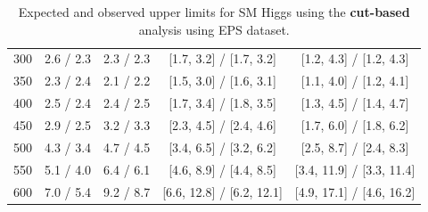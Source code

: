 \begin{table}[hbp!]
\begin{center}
\begin{tabular}{c c c c c}
300 & 2.6 / 2.3 & 2.3 / 2.3 & [1.7, 3.2] / [1.7, 3.2] & [1.2, 4.3] / [1.2, 4.3] \\
350 & 2.3 / 2.4 & 2.1 / 2.2 & [1.5, 3.0] / [1.6, 3.1] & [1.1, 4.0] / [1.2, 4.1] \\
400 & 2.5 / 2.4 & 2.4 / 2.5 & [1.7, 3.4] / [1.8, 3.5] & [1.3, 4.5] / [1.4, 4.7] \\
450 & 2.9 / 2.5 & 3.2 / 3.3 & [2.3, 4.5] / [2.4, 4.6] & [1.7, 6.0] / [1.8, 6.2] \\
500 & 4.3 / 3.4 & 4.7 / 4.5 & [3.4, 6.5] / [3.2, 6.2] & [2.5, 8.7] / [2.4, 8.3] \\
550 & 5.1 / 4.0 & 6.4 / 6.1 & [4.6, 8.9] / [4.4, 8.5] & [3.4, 11.9] / [3.3, 11.4] \\
600 & 7.0 / 5.4 & 9.2 / 8.7 & [6.6, 12.8] / [6.2, 12.1] & [4.9, 17.1] / [4.6, 16.2] \\

\hline
\end{tabular}
\caption{Expected and observed upper limits for SM Higgs using the
  {\bf cut-based} analysis using EPS dataset.}
\label{tab:cutbase_uls_eps}
\end{center}
\end{table}

